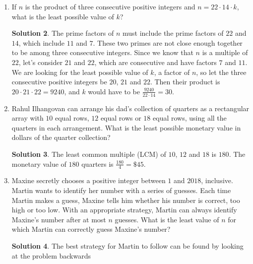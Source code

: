\documentclass{article}
\theoremstyle{definition}
\newtheorem*{solution}{Solution}
\begin{document}
\begin{multicols}{2}
\begin{enumerate}
\begin{solution}
            From $30$ up to $990$ there are $\frac{960}{30} = 32$ multiples of $30$, $33$ multiples if we include $990$.
            These are the only integers that are multiples of $4 \cdot 30 = 120$ that are divisible by $8$.
            There are $8$ of them.
            That leaves $33 - 8 = 25$ integers.
        \end{solution}
        \item If $n$ is the product of three consecutive positive integers and $n = 22 \cdot 14 \cdot k$,
        what is the least possible value of $k$?
        \begin{solution}
            The prime factors of $n$ must include the prime factors of $22$ and $14$, which include $11$ and $7$.
            These two primes are not close enough together to be among three consecutive integers.
            Since we know that $n$ is a multiple of $22$, let's consider $21$ and $22$, which are consecutive and have factors $7$ and $11$.
            We are looking for the least possible value of $k$, a factor of $n$, so let the three consecutive positive integers be $20$, $21$ and $22$.
            Then their product is $20 \cdot 21 \cdot 22 = 9240$, and $k$ would have to be $\frac{9240}{22 \cdot 14} = 30$.
        \end{solution}
        \item Rahul Ilhangovan can arrange his dad's collection of quarters as a rectangular array with $10$ equal rows,
        $12$ equal rows or $18$ equal rows, using all the quarters in each arrangement.
        What is the least possible monetary value in dollars of the quarter collection?
        \begin{solution}
            The least common multiple (LCM) of $10$, $12$ and $18$ is $180$.
            The monetary value of $180$ quarters is $\frac{180}{4} = \$45$.
        \end{solution}
        \item Maxine secretly chooses a positive integer between $1$ and $2018$, inclusive.
        Martin wants to identify her number with a series of guesses.
        Each time Martin makes a guess, Maxine tells him whether his number is correct, too high or too low.
        With an appropriate strategy, Martin can always identify Maxine's number after at most $n$ guesses.
        What is the least value of $n$ for which Martin can correctly guess Maxine's number?
        \begin{solution}
            The best strategy for Martin to follow can be found by looking at the problem backwards

\end{solution}
\end{enumerate}
\end{multicols}
\end{document}
